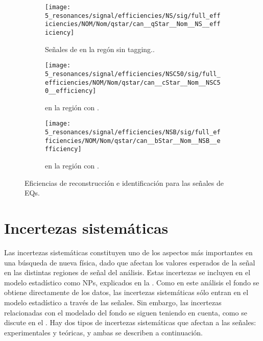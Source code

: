 \begin{figure}[ht!]
    \centering
    \begin{subfigure}[h]{0.32\linewidth}
        \centering
        \texttt{[image: 5\_resonances/signal/efficiencies/NS/sig/full\_efficiencies/NOM/Nom/qstar/can\_\_qStar\_\_Nom\_\_NS\_\_efficiency]}
        \caption{Señales de \qstar en la regón sin tagging..}
        \label{fig:signals:acc_eff:efficiencies:qstar}
    \end{subfigure}
    \hfill
    \begin{subfigure}[h]{0.32\linewidth}
        \centering
        \texttt{[image: 5\_resonances/signal/efficiencies/NSC50/sig/full\_efficiencies/NOM/Nom/qstar/can\_\_cStar\_\_Nom\_\_NSC50\_\_efficiency]}
        \caption{\cstar en la región con \ctagging.}
        \label{fig:signals:acc_eff:efficiencies:cstar}
    \end{subfigure}
    \hfill
    \begin{subfigure}[h]{0.32\linewidth}
        \centering
        \texttt{[image: 5\_resonances/signal/efficiencies/NSB/sig/full\_efficiencies/NOM/Nom/qstar/can\_\_bStar\_\_Nom\_\_NSB\_\_efficiency]}
        \caption{\bstar en la región con \btagging.}
        \label{fig:signals:acc_eff:efficiencies:bstar}
    \end{subfigure}
    \caption{Eficiencias de reconstrucción e identificación para las señales de \acp{EQ}.}
    \label{fig:signals:acc_eff:efficiencies}
\end{figure}




























\section{Incertezas sistem\'aticas}
\label{sec:signals:systs}

Las incertezas sistemáticas constituyen uno de los aspectos más importantes en una búsqueda de nueva física, dado que afectan los valores esperados de la señal en las distintas regiones de señal del análisis. Estas incertezas se incluyen en el modelo estadístico como \acp{NP}, explicados en la \Sect{\ref{subsec:strategy:stat_treatment:systs}}.
Como en este análisis el fondo se obtiene directamente de los datos, las incertezas sistemáticas sólo entran en el modelo estadístico a través de las señales. Sin embargo, las incertezas relacionadas con el modelado del fondo se siguen teniendo en cuenta, como se discute en el \Ch{\ref{ch:bkg}}.
Hay dos tipos de incertezas sistemáticas que afectan a las señales: experimentales y teóricas, y ambas se describen a continuación.




